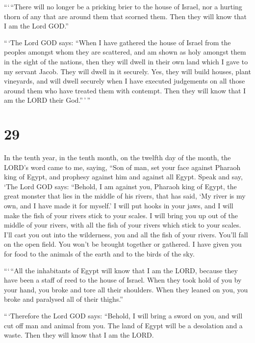  ```\,``There will no longer be a pricking brier to the
house of Israel, nor a hurting thorn of any that are around them that
scorned them. Then they will know that I am the Lord GOD.''

 ``\,`The Lord GOD says: ``When I have gathered the house
of Israel from the peoples amongst whom they are scattered, and am shown
as holy amongst them in the sight of the nations, then they will dwell
in their own land which I gave to my servant Jacob.  They
will dwell in it securely. Yes, they will build houses, plant vineyards,
and will dwell securely when I have executed judgements on all those
around them who have treated them with contempt. Then they will know
that I am the LORD their God.''\,'\,''

\hypertarget{section-27}{%
\section{29}\label{section-27}}

 In the tenth year, in the tenth month, on the twelfth day
of the month, the LORD's word came to me, saying,  ``Son of
man, set your face against Pharaoh king of Egypt, and prophesy against
him and against all Egypt.  Speak and say, `The Lord GOD
says: ``Behold, I am against you, Pharaoh king of Egypt, the great
monster that lies in the middle of his rivers, that has said, `My river
is my own, and I have made it for myself.'  I will put hooks
in your jaws, and I will make the fish of your rivers stick to your
scales. I will bring you up out of the middle of your rivers, with all
the fish of your rivers which stick to your scales.  I'll
cast you out into the wilderness, you and all the fish of your rivers.
You'll fall on the open field. You won't be brought together or
gathered. I have given you for food to the animals of the earth and to
the birds of the sky.

 ```\,``All the inhabitants of Egypt will know that I am the
LORD, because they have been a staff of reed to the house of Israel.
 When they took hold of you by your hand, you broke and tore
all their shoulders. When they leaned on you, you broke and paralysed
all of their thighs.''

 ``\,`Therefore the Lord GOD says: ``Behold, I will bring a
sword on you, and will cut off man and animal from you.  The
land of Egypt will be a desolation and a waste. Then they will know that
I am the LORD.

